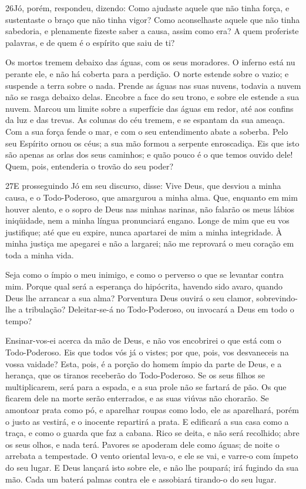 \medskip

\lettrine{26} Jó, porém, respondeu, dizendo: Como ajudaste
aquele que não tinha força, e sustentaste o braço que não tinha
vigor? Como aconselhaste aquele que não tinha sabedoria, e
plenamente fizeste saber a causa, assim como era? A quem
proferiste palavras, e de quem é o espírito que saiu de ti?

Os mortos tremem debaixo das águas, com os seus moradores. O
inferno está nu perante ele, e não há coberta para a perdição. O
norte estende sobre o vazio; e suspende a terra sobre o nada.
Prende as águas nas suas nuvens, todavia a nuvem não se rasga
debaixo delas. Encobre a face do seu trono, e sobre ele estende
a sua nuvem. Marcou um limite sobre a superfície das águas em
redor, até aos confins da luz e das trevas. As colunas do céu
tremem, e se espantam da sua ameaça. Com a sua força fende o
mar, e com o seu entendimento abate a soberba. Pelo seu
Espírito ornou os céus; a sua mão formou a serpente enroscadiça.
Eis que isto são apenas as orlas dos seus caminhos; e quão
pouco é o que temos ouvido dele! Quem, pois, entenderia o trovão do
seu poder?

\medskip

\lettrine{27} E prosseguindo Jó em seu discurso, disse:
Vive Deus, que desviou a minha causa, e o Todo-Poderoso, que
amargurou a minha alma. Que, enquanto em mim houver alento, e o
sopro de Deus nas minhas narinas, não falarão os meus lábios
iniqüidade, nem a minha língua pronunciará engano. Longe de mim
que eu vos justifique; até que eu expire, nunca apartarei de mim a
minha integridade. À minha justiça me apegarei e não a largarei;
não me reprovará o meu coração em toda a minha vida.

Seja como o ímpio o meu inimigo, e como o perverso o que se
levantar contra mim. Porque qual será a esperança do hipócrita,
havendo sido avaro, quando Deus lhe arrancar a sua alma?
Porventura Deus ouvirá o seu clamor, sobrevindo-lhe a
tribulação? Deleitar-se-á no Todo-Poderoso, ou invocará a
Deus em todo o tempo?

Ensinar-vos-ei acerca da mão de Deus, e não vos encobrirei o que
está com o Todo-Poderoso. Eis que todos vós já o vistes; por
que, pois, vos desvaneceis na vossa vaidade? Esta, pois, é a
porção do homem ímpio da parte de Deus, e a herança, que os tiranos
receberão do Todo-Poderoso. Se os seus filhos se
multiplicarem, será para a espada, e a sua prole não se fartará de
pão. Os que ficarem dele na morte serão enterrados, e as suas
viúvas não chorarão. Se amontoar prata como pó, e aparelhar
roupas como lodo, ele as aparelhará, porém o justo as
vestirá, e o inocente repartirá a prata. E edificará a sua
casa como a traça, e como o guarda que faz a cabana. Rico se
deita, e não será recolhido; abre os seus olhos, e nada terá.
Pavores se apoderam dele como águas; de noite o arrebata a
tempestade. O vento oriental leva-o, e ele se vai, e varre-o
com ímpeto do seu lugar. E Deus lançará isto sobre ele, e não
lhe poupará; irá fugindo da sua mão. Cada um baterá palmas
contra ele e assobiará tirando-o do seu lugar.

